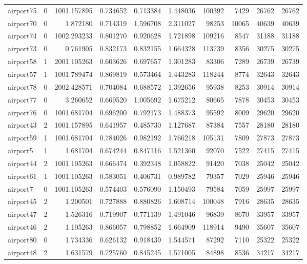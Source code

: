 \documentclass[../../../thesis.tex]{subfiles}
\begin{document}
\begin{longtable}{|l|r|r|r|r|r|r|r|r|r|}
airport75 & 0 & 1001.157895 & 0.734652 & 0.713384 & 1.448036 & 100392 & 7429 & 26762 & 26762 \\
airport70 & 0 & 1.872180 & 0.714319 & 1.596708 & 2.311027 & 98253 & 10065 & 40639 & 40639 \\
airport74 & 0 & 1002.293233 & 0.801270 & 0.920628 & 1.721898 & 109216 & 8547 & 31188 & 31188 \\
airport73 & 0 & 0.761905 & 0.832173 & 0.832155 & 1.664328 & 113739 & 8356 & 30275 & 30275 \\
airport58 & 1 & 2001.105263 & 0.603626 & 0.697657 & 1.301283 & 83306 & 7289 & 26739 & 26739 \\
airport57 & 1 & 1001.789474 & 0.869819 & 0.573464 & 1.443283 & 118244 & 8774 & 32643 & 32643 \\
airport78 & 0 & 2002.428571 & 0.704084 & 0.688572 & 1.392656 & 95938 & 8253 & 30914 & 30914 \\
airport77 & 0 & 3.260652 & 0.669520 & 1.005692 & 1.675212 & 80665 & 7878 & 30453 & 30453 \\
airport76 & 0 & 1001.681704 & 0.696200 & 0.792173 & 1.488373 & 95592 & 8009 & 29620 & 29620 \\
airport43 & 2 & 1001.157895 & 0.641957 & 0.485730 & 1.127687 & 87384 & 7557 & 28180 & 28180 \\
airport59 & 1 & 1001.681704 & 0.784026 & 0.982192 & 1.766218 & 105131 & 7809 & 27873 & 27873 \\
airport5 & 1 & 1.681704 & 0.674244 & 0.847116 & 1.521360 & 92070 & 7522 & 27415 & 27415 \\
airport44 & 2 & 1001.105263 & 0.666474 & 0.392348 & 1.058822 & 91420 & 7038 & 25042 & 25042 \\
airport61 & 1 & 1001.105263 & 0.583051 & 0.406731 & 0.989782 & 79357 & 7029 & 25946 & 25946 \\
airport7 & 0 & 1001.105263 & 0.574403 & 0.576090 & 1.150493 & 79584 & 7059 & 25997 & 25997 \\
airport45 & 2 & 1.200501 & 0.727888 & 0.880826 & 1.608714 & 100048 & 7916 & 28635 & 28635 \\
airport47 & 2 & 1.526316 & 0.719907 & 0.771139 & 1.491046 & 96839 & 8670 & 33957 & 33957 \\
airport46 & 2 & 1.105263 & 0.866057 & 0.798852 & 1.664909 & 118914 & 9490 & 35607 & 35607 \\
airport80 & 0 & 1.734336 & 0.626132 & 0.918439 & 1.544571 & 87292 & 7110 & 25322 & 25322 \\
airport48 & 2 & 1.631579 & 0.725760 & 0.845245 & 1.571005 & 84898 & 8536 & 34217 & 34217 \\

\end{longtable}
\end{document}
